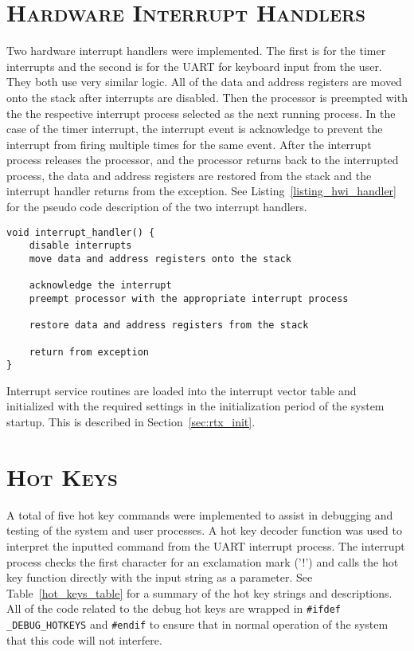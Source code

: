 \documentclass[oneside]{report}
\begin{document}
\section{\textsc{Hardware Interrupt Handlers}}
Two hardware interrupt handlers were implemented. The first is for the timer
interrupts and the second is for the UART for keyboard input from the user.
They both use very similar logic. All of the data and address registers are
moved onto the stack after interrupts are disabled. Then the processor is
preempted with the the respective interrupt process selected as the next
running process. In the case of the timer interrupt, the interrupt event is
acknowledge to prevent the interrupt from firing multiple times for the same
event. After the interrupt process releases the processor, and the processor
returns back to the interrupted process, the data and address registers are
restored from the stack and the interrupt handler returns from the exception.
See Listing~\ref{listing_hwi_handler} for the pseudo code description of the
two interrupt handlers.

\begin{lstlisting}
void interrupt_handler() {
    disable interrupts
    move data and address registers onto the stack

    acknowledge the interrupt
    preempt processor with the appropriate interrupt process

    restore data and address registers from the stack

    return from exception
}
\end{lstlisting}

Interrupt service routines are loaded into the interrupt vector table and
initialized with the required settings in the initialization period of the
system startup. This is described in Section~\ref{sec:rtx_init}.

\section{\textsc{Hot Keys}}
\label{sec:hot_keys}

A total of five hot key commands were implemented to assist in debugging and
testing of the system and user processes. A hot key decoder function was used to
interpret the inputted command from the UART interrupt process. The interrupt
process checks the first character for an exclamation mark ('!') and calls the
hot key function directly with the input string as a parameter. See
Table~\ref{hot_keys_table} for a summary of the hot key strings and
descriptions. All of the code related to the debug hot keys are wrapped in
\texttt{\#ifdef \_DEBUG\_HOTKEYS} and \texttt{\#endif} to ensure that in normal
operation of the system that this code will not interfere.
\end{document}
